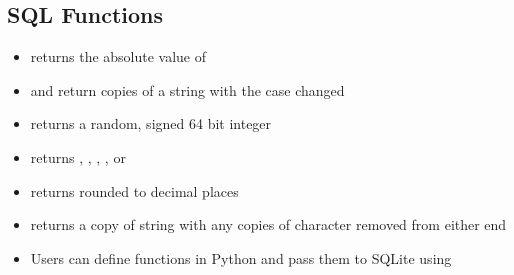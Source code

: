 \documentclass[a4paper]{article}
\begin{document}
\subsection{SQL Functions}
\begin{itemize}
    \item {} returns the absolute value of 
    \item {} and  return copies of a string with the case changed
    \item {} returns a random, signed 64 bit integer
    \item {} returns , , , , or 
    \item {} returns  rounded to  decimal places
    \item {} returns a copy of string  with any copies of character  removed from either end
    \item Users can define functions in Python and pass them to SQLite using 
\end{itemize}
\end{document}
